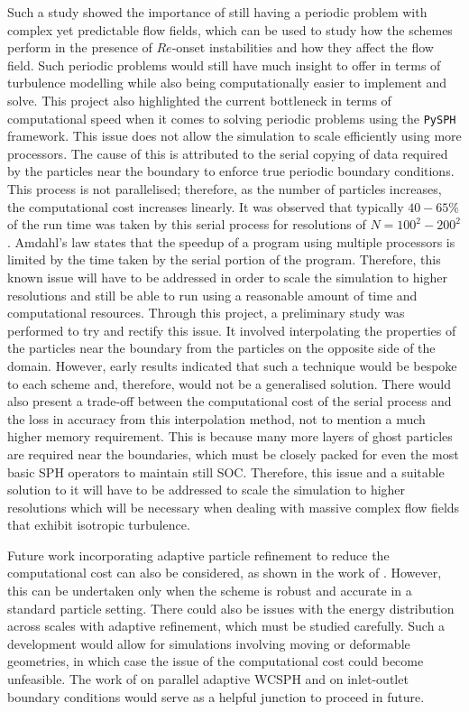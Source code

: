 Such a study showed the importance of still having a periodic problem with complex yet predictable flow fields, which can be used to study how the schemes perform in the presence of $Re$-onset instabilities and how they affect the flow field. Such periodic problems would still have much insight to offer in terms of turbulence modelling while also being computationally easier to implement and solve.
This project also highlighted the current bottleneck in terms of computational speed when it comes to solving periodic problems using the \texttt{PySPH} framework. This issue does not allow the simulation to scale efficiently using more processors. The cause of this is attributed to the serial copying of data required by the particles near the boundary to enforce true periodic boundary conditions. This process is not parallelised; therefore, as the number of particles increases, the computational cost increases linearly. It was observed that typically $40-65\%$ of the run time was taken by this serial process for resolutions of $N = 100^2-200^2$. Amdahl's law states that the speedup of a program using multiple processors is limited by the time taken by the serial portion of the program. Therefore, this known issue will have to be addressed in order to scale the simulation to higher resolutions and still be able to run using a reasonable amount of time and computational resources.
Through this project, a preliminary study was performed to try and rectify this issue. It involved interpolating the properties of the particles near the boundary from the particles on the opposite side of the domain. However, early results indicated that such a technique would be bespoke to each scheme and, therefore, would not be a generalised solution. There would also present a trade-off between the computational cost of the serial process and the loss in accuracy from this interpolation method, not to mention a much higher memory requirement. This is because many more layers of ghost particles are required near the boundaries, which must be closely packed for even the most basic SPH operators to maintain still SOC.
Therefore, this issue and a suitable solution to it will have to be addressed to scale the simulation to higher resolutions which will be necessary when dealing with massive complex flow fields that exhibit isotropic turbulence.

Future work incorporating adaptive particle refinement to reduce the computational cost can also be considered, as shown in the work of \cite{Muta2022}.
However, this can be undertaken only when the scheme is robust and accurate in a standard particle setting. There could also be issues with the energy distribution across scales with adaptive refinement, which must be studied carefully.
Such a development would allow for simulations involving moving or deformable geometries, in which case the issue of the computational cost could become unfeasible. 
The work of \cite{Haftu2022} on parallel adaptive WCSPH and \cite{negi2020improved} on inlet-outlet boundary conditions would serve as a helpful junction to proceed in future.

